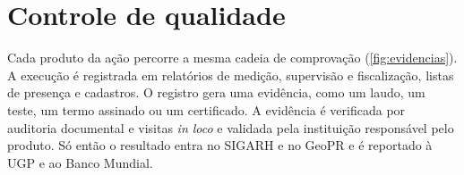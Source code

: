\FloatBarrier
\section{Controle de qualidade}
\label{sec:monitoramento}

Cada produto da ação percorre a mesma cadeia de comprovação
(\autoref{fig:evidencias}). A execução é registrada em relatórios de medição,
supervisão e fiscalização, listas de presença e cadastros. O registro gera uma
evidência, como um laudo, um teste, um termo assinado ou um certificado. A
evidência é verificada por auditoria documental e visitas \textit{in loco} e
validada pela instituição responsável pelo produto. Só então o resultado entra
no SIGARH e no GeoPR e é reportado à UGP e ao Banco Mundial.

